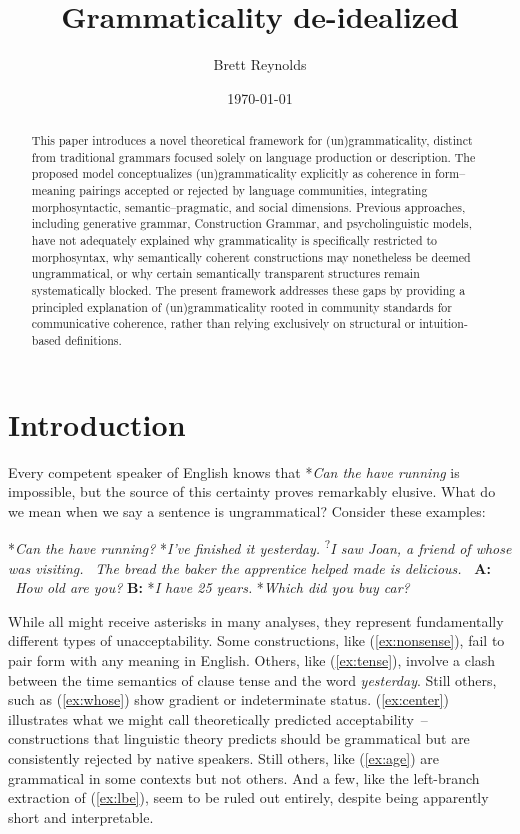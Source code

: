 \documentclass[12pt,letterpaper]{article}
\title{Grammaticality de-idealized}
\author{Brett Reynolds}
\date{\today}
\begin{document}
\maketitle

\begin{abstract}
    This paper introduces a novel theoretical framework for (un)gram\-maticality, distinct from traditional grammars focused solely on language production or description. The proposed model conceptualizes (un)grammaticality explicitly as coherence in form–meaning pairings accepted or rejected by language communities, integrating morphosyntactic, semantic–pragmatic, and social dimensions. Previous approaches, including generative grammar, Construction Grammar, and psycholinguistic models, have not adequately explained why grammaticality is specifically restricted to morphosyntax, why semantically coherent constructions may nonetheless be deemed ungrammatical, or why certain semantically transparent structures remain systematically blocked. The present framework addresses these gaps by providing a principled explanation of (un)grammaticality rooted in community standards for communicative coherence, rather than relying exclusively on structural or intuition-based definitions.
\end{abstract}

\newpage
\section*{Introduction}

Every competent speaker of English knows that *\textit{Can the have running} is impossible, but the source of this certainty proves remarkably elusive. What do we mean when we say a sentence is ungrammatical? Consider these examples:

\ea \label{ex:starting-stars}
\ea\label{ex:nonsense} *\textit{Can the have running?}
\ex\label{ex:tense} *\textit{I've finished it yesterday.}
\ex\textsuperscript{?}\textit{I saw Joan, a friend of whose was visiting.}\label{ex:whose} 
\ex\label{ex:center} \textit{~The bread the baker the apprentice helped made is delicious.}
\ex\label{ex:age} \textbf{~A:} \textit{~How old are you?} \textbf{B:} *\textit{I have 25 years.}
\ex\label{ex:lbe} *\textit{Which did you buy car?}
\z\z

While all might receive asterisks in many analyses, they represent fundamentally different types of unacceptability. Some constructions, like (\ref{ex:nonsense}), fail to pair form with any meaning in English. Others, like (\ref{ex:tense}), involve a clash between the time semantics of clause tense and the word \textit{yesterday}. Still others, such as (\ref{ex:whose}) show gradient or indeterminate status. (\ref{ex:center}) illustrates what we might call theoretically predicted acceptability~-- constructions that linguistic theory predicts should be grammatical but are consistently rejected by native speakers. Still others, like (\ref{ex:age}) are grammatical in some contexts but not others. And a few, like the left-branch extraction of (\ref{ex:lbe}), seem to be ruled out entirely, despite being apparently short and interpretable.
\end{document}
